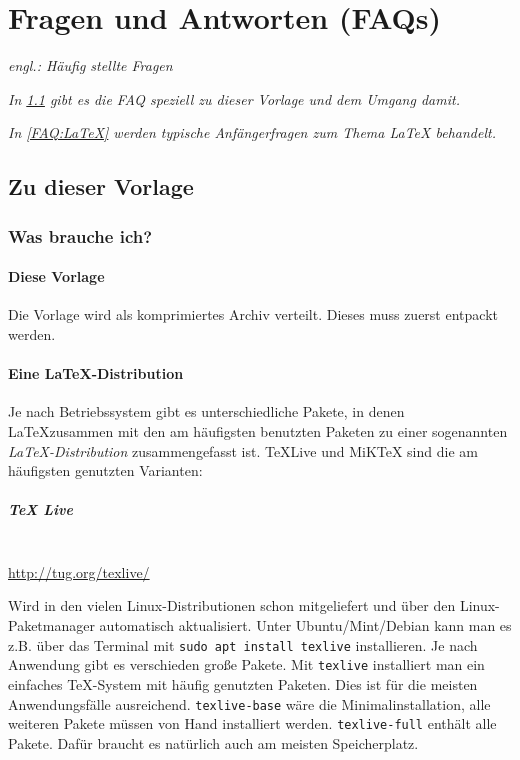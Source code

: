 \chapter{Fragen und Antworten (FAQs)}
	\label{sec:anhang:faq}
	\emph{engl.: Häufig stellte Fragen}
	
	\emph{In \ref{FAQ:Vorlage} gibt es die FAQ speziell zu dieser Vorlage und dem Umgang damit.}
	
	\emph{In \ref{FAQ:LaTeX} werden typische Anfängerfragen zum Thema \LaTeX{} behandelt.} 
	
	\section{Zu dieser Vorlage}\label{FAQ:Vorlage}
		\subsection{Was brauche ich?}
			\subsubsection{Diese Vorlage}
			Die Vorlage wird als komprimiertes Archiv verteilt. Dieses muss zuerst entpackt werden.
			
			\subsubsection{Eine LaTeX-Distribution}
			Je nach Betriebssystem gibt es unterschiedliche Pakete, in denen \LaTeX zusammen mit den am häufigsten benutzten Paketen zu einer sogenannten \emph{\LaTeX-Distribution} zusammengefasst ist.
%			
			\TeX Live und MiKTeX sind die am häufigsten genutzten Varianten:
			
			\paragraph{TeX Live}~\\
			     
			\hfill
			\url{http://tug.org/texlive/}
			\medskip
			
			\noindent Wird in den vielen Linux-Distributionen schon mitgeliefert und über den Linux-Paketmanager automatisch aktualisiert.
			Unter Ubuntu/Mint/Debian kann man es z.B. über das Terminal mit  
			\lstinline|sudo apt install texlive| installieren.
			Je nach Anwendung gibt es verschieden große Pakete. Mit \lstinline|texlive| installiert man ein einfaches TeX-System mit häufig genutzten Paketen. Dies ist für die meisten Anwendungsfälle ausreichend.
			\lstinline|texlive-base| wäre die Minimalinstallation, alle weiteren Pakete müssen von Hand installiert werden.
			\lstinline|texlive-full| enthält alle Pakete. Dafür braucht es natürlich auch am meisten Speicherplatz.
			
